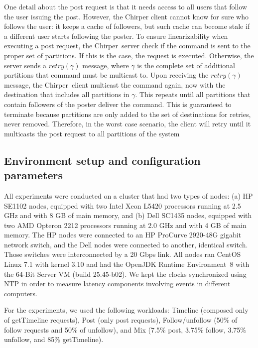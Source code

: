 \documentclass[11pt]{article}
\newcommand{\appname}{Chirper} %
\begin{document}
One detail about the post request is that it needs access to all users that follow the user issuing the post.
However, the \appname{} client cannot know for sure who follows the user: it keeps a cache of followers, but such cache can become stale if a different user starts following the poster.
To ensure linearizability when executing a post request, the \appname\ server check if the command is sent to the proper set of partitions. If this is the case, the request is executed.
Otherwise, the server sends a $retry(\gamma)$ message, where $\gamma$ is the complete set of additional partitions that command must be multicast to. Upon receiving the $retry(\gamma)$ message, the \appname\ client multicast the command again, now with the destination that includes all partitions in $\gamma$. This repeats until all partitions that contain followers of the poster deliver the command. This is guaranteed to terminate because partitions are only added to the set of destinations for retries, never removed. Therefore, in the worst case scenario, the client will retry until it multicasts the post request to all partitions of the system

\label{sec:evaluation:app}
\subsection{Environment setup and configuration parameters}

All experiments were conducted on a cluster that had two types of nodes: (a) HP SE1102 nodes, equipped with two Intel Xeon L5420 processors running at 2.5 GHz and with 8 GB of main memory, and (b) Dell SC1435 nodes, equipped with two AMD Opteron 2212 processors running at 2.0 GHz and with 4 GB of main memory. The HP nodes were connected to an HP ProCurve 2920-48G gigabit network switch, and the Dell nodes were connected to another, identical switch. Those switches were interconnected by a 20 Gbps link.
All nodes ran CentOS Linux 7.1 with kernel 3.10 and had the OpenJDK Runtime Environment~8 with the \mbox{64-Bit} Server VM (build 25.45-b02).
We kept the clocks synchronized using NTP in order to measure latency components involving events in different computers.

For the experiments, we used the following workloads:
Timeline (composed only of getTimeline requests),
Post (only post requests),
Follow/unfollow (50\% of follow requests and 50\% of unfollow), and
Mix (7.5\% post, 3.75\% follow, 3.75\% unfollow, and 85\% getTimeline).

\label{sec:evaluation:setup}
\end{document}
